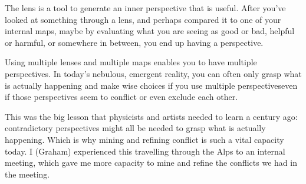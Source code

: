 The lens is a tool to generate an inner perspective that is useful. After you've looked at something through a lens, and perhaps compared it to one of your internal maps, maybe by evaluating what you are seeing as good or bad, helpful or harmful, or somewhere in between, you end up having a perspective.


Using multiple lenses and multiple maps enables you to have multiple perspectives. In today’s nebulous, emergent reality, you can often only grasp what is actually happening and make wise choices if you use multiple perspectives\textemdash even if those perspectives seem to conflict or even exclude each other. 


This was the big lesson that physicists and artists needed to learn a century ago: contradictory perspectives might all be needed to grasp what is actually happening. Which is why mining and refining conflict is such a vital capacity today. I (Graham) experienced this travelling through the Alps to an internal meeting, which gave me more capacity to mine and refine the conflicts we had in the meeting.


